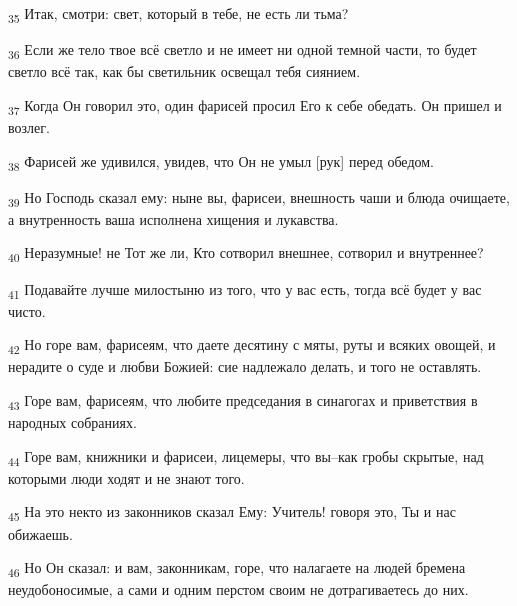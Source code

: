 \begin{tcolorbox}
\textsubscript{35} Итак, смотри: свет, который в тебе, не есть ли тьма?
\end{tcolorbox}
\begin{tcolorbox}
\textsubscript{36} Если же тело твое всё светло и не имеет ни одной темной части, то будет светло всё так, как бы светильник освещал тебя сиянием.
\end{tcolorbox}
\begin{tcolorbox}
\textsubscript{37} Когда Он говорил это, один фарисей просил Его к себе обедать. Он пришел и возлег.
\end{tcolorbox}
\begin{tcolorbox}
\textsubscript{38} Фарисей же удивился, увидев, что Он не умыл [рук] перед обедом.
\end{tcolorbox}
\begin{tcolorbox}
\textsubscript{39} Но Господь сказал ему: ныне вы, фарисеи, внешность чаши и блюда очищаете, а внутренность ваша исполнена хищения и лукавства.
\end{tcolorbox}
\begin{tcolorbox}
\textsubscript{40} Неразумные! не Тот же ли, Кто сотворил внешнее, сотворил и внутреннее?
\end{tcolorbox}
\begin{tcolorbox}
\textsubscript{41} Подавайте лучше милостыню из того, что у вас есть, тогда всё будет у вас чисто.
\end{tcolorbox}
\begin{tcolorbox}
\textsubscript{42} Но горе вам, фарисеям, что даете десятину с мяты, руты и всяких овощей, и нерадите о суде и любви Божией: сие надлежало делать, и того не оставлять.
\end{tcolorbox}
\begin{tcolorbox}
\textsubscript{43} Горе вам, фарисеям, что любите председания в синагогах и приветствия в народных собраниях.
\end{tcolorbox}
\begin{tcolorbox}
\textsubscript{44} Горе вам, книжники и фарисеи, лицемеры, что вы--как гробы скрытые, над которыми люди ходят и не знают того.
\end{tcolorbox}
\begin{tcolorbox}
\textsubscript{45} На это некто из законников сказал Ему: Учитель! говоря это, Ты и нас обижаешь.
\end{tcolorbox}
\begin{tcolorbox}
\textsubscript{46} Но Он сказал: и вам, законникам, горе, что налагаете на людей бремена неудобоносимые, а сами и одним перстом своим не дотрагиваетесь до них.
\end{tcolorbox}
